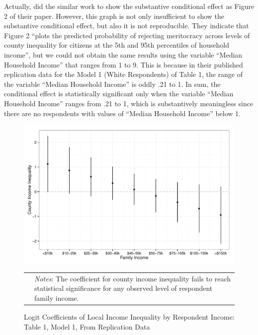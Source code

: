 Actually, \citet{Newman, Johnston, and Lown2015a, 334} did the similar work to show the substantive conditional effect as Figure 2 of their paper. However, this graph is not only insufficient to show the substantive conditional effect, but also it is not reproducible. They indicate that Figure 2 “plots the predicted probability of rejecting meritocracy across levels of county inequality for citizens at the 5th and 95th percentiles of household income”, but we could not obtain the same results using the variable “Median Household Income” that ranges from 1 to 9. This is because in their published replication data for the Model 1 (White Respondents) of Table 1, the range of the variable “Median Household Income” is oddly .21 to 1. In sum, the conditional effect is statistically significant only when the variable “Median Household Income” ranges from .21 to 1, which is substantively meaningless since there are no respondents with values of “Median Household Income” below 1. 




\begin{figure}[htbp] 
  \caption{Logit Coefficients of Local Income Inequality by Respondent Income: Table 1, Model 1, From Replication Data}
  \label{F:coef.t1m1}
  \begin{center}
    \includegraphics[width=5.25in]{../figures/07_plot_interaction_terms_t1m1.pdf}
  \end{center}
  \begin{footnotesize}
  \begin{tabular}{p{.1in} p{5.1in}}
  & \emph{Notes}: The coefficient for county income inequality fails to reach statistical significance for any observed level of respondent family income.
  \end{tabular}
  \end{footnotesize}
\end{figure}



